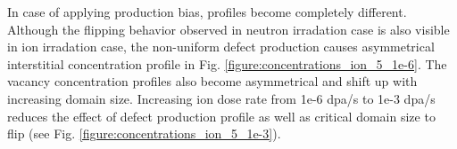 \documentclass[a4paper]{article}
\begin{document}
      \newpage
      In case of applying production bias, profiles become completely different. Although the flipping behavior observed in neutron irradation case is also visible in ion irradation case, the non-uniform defect production causes asymmetrical interstitial concentration profile in Fig. \ref{figure:concentrations_ion_5_1e-6}. The vacancy concentration profiles also become asymmetrical and shift up with increasing domain size. Increasing ion dose rate from 1e-6 dpa/s to 1e-3 dpa/s reduces the effect of defect production profile as well as critical domain size to flip (see Fig. \ref{figure:concentrations_ion_5_1e-3}).
      \begin{figure}[h!]  %
        \centering
        \qquad

\end{figure}
\end{document}
